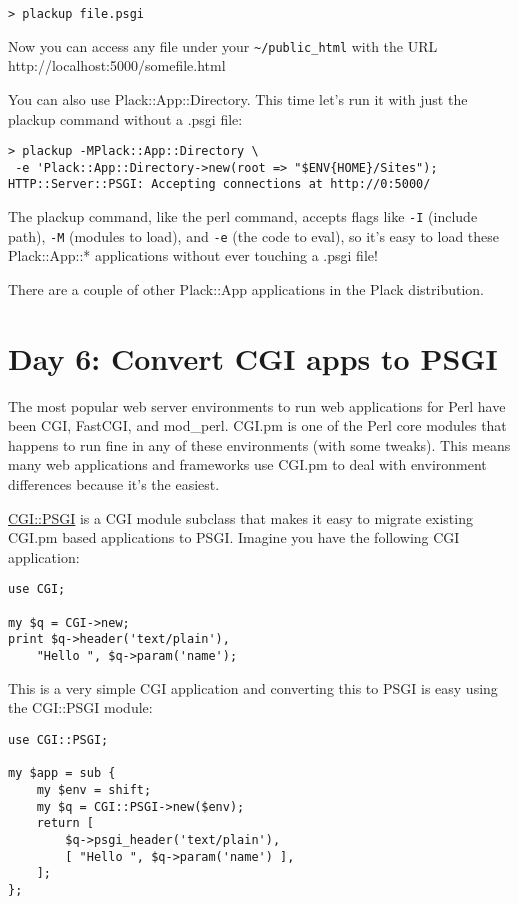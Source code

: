 \begin{lstlisting}
> plackup file.psgi
\end{lstlisting}

Now you can access any file under your \lstinline!~/public_html! with
the URL http://localhost:5000/somefile.html

You can also use Plack::App::Directory. This time let's run it with just
the plackup command without a .psgi file:

\begin{lstlisting}
> plackup -MPlack::App::Directory \
 -e 'Plack::App::Directory->new(root => "$ENV{HOME}/Sites");
HTTP::Server::PSGI: Accepting connections at http://0:5000/
\end{lstlisting}

The plackup command, like the perl command, accepts flags like
\lstinline!-I! (include path), \lstinline!-M! (modules to load), and
\lstinline!-e! (the code to eval), so it's easy to load these
Plack::App::* applications without ever touching a .psgi file!

There are a couple of other Plack::App applications in the Plack
distribution.

\section{Day 6: Convert CGI apps to
PSGI}\label{day-6-convert-cgi-apps-to-psgi}

The most popular web server environments to run web applications for
Perl have been CGI, FastCGI, and mod\_perl. CGI.pm is one of the Perl
core modules that happens to run fine in any of these environments (with
some tweaks). This means many web applications and frameworks use CGI.pm
to deal with environment differences because it's the easiest.

\href{http://search.cpan.org/perldoc?CGI::PSGI}{CGI::PSGI} is a CGI
module subclass that makes it easy to migrate existing CGI.pm based
applications to PSGI. Imagine you have the following CGI application:

\begin{lstlisting}
use CGI;

my $q = CGI->new;
print $q->header('text/plain'),
    "Hello ", $q->param('name');
\end{lstlisting}

This is a very simple CGI application and converting this to PSGI is
easy using the CGI::PSGI module:

\begin{lstlisting}
use CGI::PSGI;

my $app = sub {
    my $env = shift;
    my $q = CGI::PSGI->new($env);
    return [
        $q->psgi_header('text/plain'),
        [ "Hello ", $q->param('name') ],
    ];
};
\end{lstlisting}

